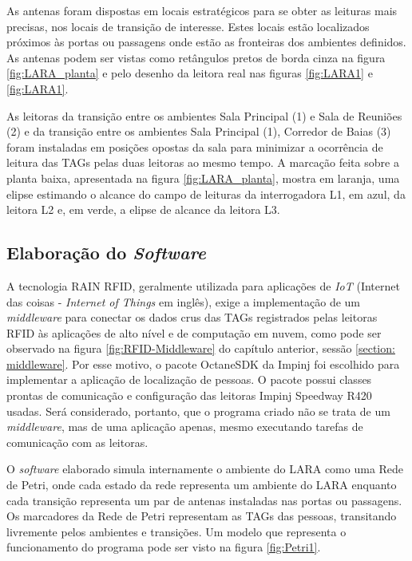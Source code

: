As antenas foram dispostas em locais estratégicos para se obter as leituras mais precisas, nos locais de transição de interesse. Estes locais estão localizados próximos às portas ou passagens onde estão as fronteiras dos ambientes definidos. As antenas podem ser vistas como retângulos pretos de borda cinza na figura \ref{fig:LARA_planta} e pelo desenho da leitora real nas figuras \ref{fig:LARA1} e \ref{fig:LARA1}.

As leitoras da transição entre os ambientes Sala Principal (1) e Sala de Reuniões (2) e da transição entre os ambientes Sala Principal (1), Corredor de Baias (3) foram instaladas em posições opostas da sala para minimizar a ocorrência de leitura das TAGs pelas duas leitoras ao mesmo tempo. A marcação feita sobre a planta baixa, apresentada na figura \ref{fig:LARA_planta}, mostra em laranja, uma elipse estimando o alcance do campo de leituras da interrogadora L1, em azul, da leitora L2 e, em verde, a elipse de alcance da leitora L3. 

 \subsection{Elaboração do \textit{Software}} \label{section:software}
 
 A tecnologia RAIN RFID, geralmente utilizada para aplicações de \textit{IoT} (Internet das coisas - \textit{Internet of Things} em inglês), exige a implementação de um \textit{middleware} para conectar os dados crus das TAGs registrados pelas leitoras RFID às aplicações de alto nível e de computação em nuvem, como pode ser observado na figura \ref{fig:RFID-Middleware} do capítulo anterior, sessão \ref{section: middleware}. Por esse motivo, o pacote OctaneSDK da Impinj foi escolhido para implementar a aplicação de localização de pessoas. O pacote possui classes prontas de comunicação e configuração das leitoras Impinj Speedway R420 usadas. Será considerado, portanto, que o programa criado não se trata de um \textit{middleware}, mas de uma aplicação apenas, mesmo executando tarefas de comunicação com as leitoras.
 
 O \textit{software} elaborado simula internamente o ambiente do LARA como uma Rede de Petri, onde cada estado da rede representa um ambiente do LARA enquanto cada transição representa um par de antenas instaladas nas portas ou passagens. Os marcadores da Rede de Petri representam as TAGs das pessoas, transitando livremente pelos ambientes e transições. Um modelo que representa o funcionamento do programa pode ser visto na figura \ref{fig:Petri1}.
 
